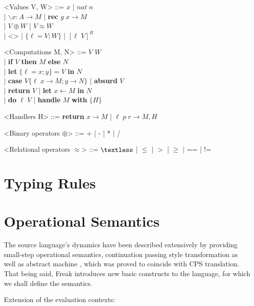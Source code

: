 \documentclass[declaration,shortabstract]{iithesis}
\begin{document}
    \begin{grammar}

        <Values V, W> ::= $ x $ | $nat \; n$ \\
            | $ \backslash x : A \rightarrow M $ | \textbf{rec} $ g \; x \rightarrow M $\\
            | $V \oplus W$ | $V \approx W$ \\
            | <> | $ \{ \ell = V; W\} $  | $[ \ell \; V]^{R}$

        <Computations M, N> ::= $ V $ $ W $ \\
            | \textbf{if} $V$ \textbf{then} $M$ \textbf{else} $N$ \\
            | \textbf{let} $\{\ell  = x; y\} = V$ \textbf{in} $ N $ \\
            | \textbf{case} $V \{ \ell \; x \rightarrow M; y \rightarrow N\}$ | \textbf{absurd} $ V $ \\
            | \textbf{return} $V$ | \textbf{let} $ x \leftarrow M $ \textbf{in} $ N $ \\
            | \textbf{do} $\ell \; V$ | \textbf{handle} $M$ \textbf{with} $ \{ H \} $

        <Handlers H> ::= \textbf{return} $ x \rightarrow M $ | $ \ell \; p \; r \rightarrow M, H $

        <Binary operators $\oplus$> ::= + | - | * | /

        <Relational operators $\approx$> ::= $ \textless $ | $\leqslant$ | $>$ | $\geqslant$ | == | !=

    \end{grammar}


\section{Typing Rules}
\section{Operational Semantics}

    The source language's dynamics have been described
    extensively by providing small-step operational semantics,
    continuation passing style transformation \cite{handlers-cps} as well
    as abstract machine \cite{liberating-effects}, which was proved to coincide
    with CPS translation. That being said, Freak introduces new basic
    constructs to the language, for which we shall define the semantics.

    \begin{flushleft}
    Extension of the evaluation contexts:
    \end{flushleft}
\end{document}
